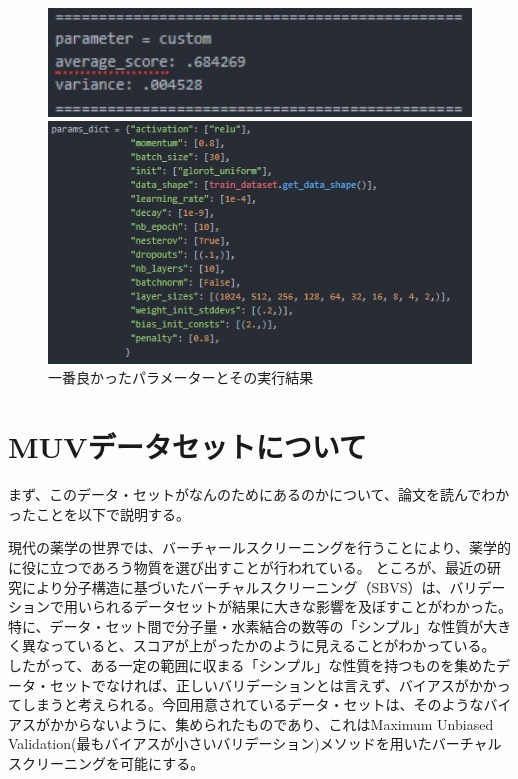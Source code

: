 \documentclass[a4j,11pt]{jarticle}
\begin{document}
\begin{figure}
	\begin{minipage}{0.50\hsize}
		\begin{center}
			\includegraphics[width=12cm, bb=0 0 296 76]{optimal2.jpg}
		\end{center}
	\end{minipage}
	\begin{minipage}{0.50\hsize}
		\begin{center}
			\includegraphics[width=12cm, bb=0 0 488 279]{optimal2p.jpg}
		\end{center}
	\end{minipage}
	\caption{一番良かったパラメーターとその実行結果}
	\label{optimal2}
\end{figure}

\clearpage

\section{MUVデータセットについて}

まず、このデータ・セットがなんのためにあるのかについて、論文\cite{thesis}を読んでわかったことを以下で説明する。


現代の薬学の世界では、バーチャールスクリーニングを行うことにより、薬学的に役に立つであろう物質を選び出すことが行われている。
ところが、最近の研究により分子構造に基づいたバーチャルスクリーニング（SBVS）は、バリデーションで用いられるデータセットが結果に大きな影響を及ぼすことがわかった。特に、データ・セット間で分子量・水素結合の数等の「シンプル」な性質が大きく異なっていると、スコアが上がったかのように見えることがわかっている。
したがって、ある一定の範囲に収まる「シンプル」な性質を持つものを集めたデータ・セットでなければ、正しいバリデーションとは言えず、バイアスがかかってしまうと考えられる。今回用意されているデータ・セットは、そのようなバイアスがかからないように、集められたものであり、これはMaximum Unbiased Validation(最もバイアスが小さいバリデーション)メソッドを用いたバーチャルスクリーニングを可能にする。
\end{document}
